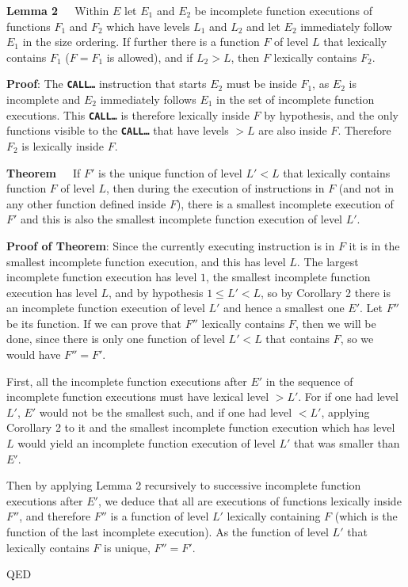 \documentclass[12pt]{article}
\newcommand{\TT}[1]{{\tt \bfseries #1}}
\newenvironment{indpar}[1][0.3in]%
	{\begin{list}{}%
		     {\setlength{\itemsep}{0in}%
		      \setlength{\topsep}{0in}%
		      \setlength{\parsep}{1ex}%
		      \setlength{\labelwidth}{#1}%
		      \setlength{\leftmargin}{#1}%
		      \addtolength{\leftmargin}{\labelsep}}%
	 \item}%
	{\end{list}}
\begin{document}
\begin{indpar}
{\bf Lemma 2}~~~Within $E$
let $E_1$ and $E_2$ be incomplete function
executions of functions $F_1$ and $F_2$ which have levels $L_1$ and $L_2$
and let  $E_2$ immediately follow $E_1$ in the size
ordering.  If further there is a function $F$ of level $L$ that lexically
contains $F_1$ ($F=F_1$ is allowed), and if $L_2>L$, then $F$ lexically contains
$F_2$.
\end{indpar}
\begin{indpar}
{\bf Proof}: The \TT{CALL\ldots} instruction that starts $E_2$ must be
inside $F_1$, as $E_2$ is incomplete
and $E_2$ immediately follows $E_1$ in the set of incomplete
function executions.
This \TT{CALL\ldots}
is therefore lexically inside $F$ by hypothesis, and the only functions visible
to the \TT{CALL\ldots} that have levels $>L$ are also inside $F$.
Therefore $F_2$ is lexically inside $F$.
\end{indpar}

\begin{indpar}
{\bf Theorem}~~~If $F'$ is the unique function of level $L' < L$ that lexically
contains function $F$ of level $L$,
then during the execution of instructions in $F$ (and not in any other
function defined inside $F$),
there is a smallest incomplete execution of $F'$ and this is also
the smallest incomplete function execution of level $L'$.
\end{indpar}

\begin{indpar}
{\bf Proof of Theorem}: Since the currently executing instruction is in $F$
it is in the smallest incomplete function execution, and this has level $L$.
The largest incomplete function execution
has level $1$, the smallest
incomplete function execution has level
$L$, and by hypothesis $1\leq L'<L$,
so by Corollary 2 there is an incomplete function execution of level $L'$
and hence a smallest one $E'$.  Let $F''$ be its function.
If we can prove that $F''$ lexically contains $F$, then we will be done,
since there is only one function of level $L' < L$ that contains $F$,
so we would have $F'' = F'$.

First, all the incomplete function executions after $E'$ in the sequence
of incomplete function executions
must have lexical level $>L'$.  For if one had level $L'$, $E'$ would
not be the smallest such, and if one had level $<L'$, applying Corollary 2
to it and the smallest incomplete function execution which has level $L$ would
yield an incomplete function execution of level $L'$ that was 
smaller than $E'$.

Then by applying Lemma 2 recursively to successive incomplete function
executions after $E'$, we deduce that all are executions of functions
lexically inside $F''$, and therefore $F''$ is a function of
level $L'$ lexically containing $F$ (which is the function of the
last incomplete execution).  As the function of level $L'$
that lexically contains $F$ is unique, $F''=F'$.

QED
\end{indpar}
\end{document}
